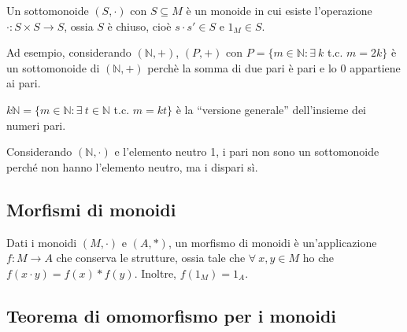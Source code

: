 Un sottomonoide $(S, \cdot)$ con $S \subseteq M$ \`e un monoide in cui esiste l'operazione $\cdot : S \times S \to S$, ossia $S$ \`e chiuso, cio\`e $s \cdot s' \in S$ e $1_M \in S$.

Ad esempio, considerando $(\mathbb{N}, +)$, $(P, +)$ con $P = \{ m \in \mathbb{N} : \exists \ k $ t.c. $m = 2k \}$ \`e un sottomonoide di $(\mathbb{N},+)$ perch\`e la somma di due pari \`e pari e lo 0 appartiene ai pari.

$k \mathbb{N} = \{ m \in \mathbb{N} : \exists \ t \in \mathbb{N} $ t.c. $ m = k t\}$ \`e la ``versione generale'' dell'insieme dei numeri pari.

Considerando $(\mathbb{N}, \cdot)$ e l'elemento neutro 1, i pari non sono un sottomonoide perch\'e non hanno l'elemento neutro, ma i dispari s\`i.

\subsection{Morfismi di monoidi}

\begin{defn}
Dati i monoidi $(M, \cdot)$ e $(A, \ast)$, un morfismo di monoidi \`e un'applicazione $f : M \to A$ che conserva le strutture, ossia tale che $\forall \ x,y \in M $ ho che $f(x \cdot y) = f(x) \ast f(y)$. Inoltre, $f(1_M) = 1_A$.
\end{defn}

\subsection{Teorema di omomorfismo per i monoidi}


